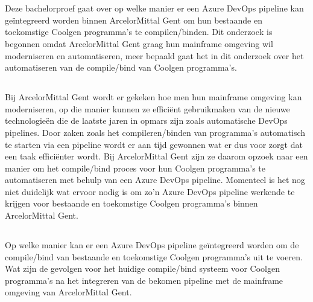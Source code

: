 
\chapter{}%
\label{ch:inleiding}

Deze bachelorproef gaat over op welke manier er een Azure DevOps pipeline kan geïntegreerd worden binnen ArcelorMittal Gent om hun bestaande en toekomstige Coolgen programma's te compilen/binden. 
Dit onderzoek is begonnen omdat ArcelorMittal Gent graag hun mainframe omgeving wil moderniseren en automatiseren, meer bepaald gaat het in dit onderzoek over het automatiseren van de compile/bind van Coolgen programma's.



\section{}%
\label{sec:probleemstelling}

Bij ArcelorMittal Gent wordt er gekeken hoe men hun mainframe omgeving kan moderniseren, op die manier kunnen ze efficiënt gebruikmaken van de nieuwe technologieën die de laatste jaren in opmars zijn zoals automatische DevOps pipelines. 
Door zaken zoals het compileren/binden van programma's automatisch te starten via een pipeline wordt er aan tijd gewonnen wat er dus voor zorgt dat een taak efficiënter wordt. 
Bij ArcelorMittal Gent zijn ze daarom opzoek naar een manier om het compile/bind proces voor hun Coolgen programma's te automatiseren met behulp van een Azure DevOps pipeline.
Momenteel is het nog niet duidelijk wat ervoor nodig is om zo'n Azure DevOps pipeline werkende te krijgen voor bestaande en toekomstige Coolgen programma's binnen ArcelorMittal Gent.

\section{}%
\label{sec:onderzoeksvraag}

Op welke manier kan er een Azure DevOps pipeline geïntegreerd worden om de compile/bind van bestaande en toekomstige Coolgen programma's uit te voeren. 
Wat zijn de gevolgen voor het huidige compile/bind systeem voor Coolgen programma's na het integreren van de bekomen pipeline met de mainframe omgeving van ArcelorMittal Gent. 

